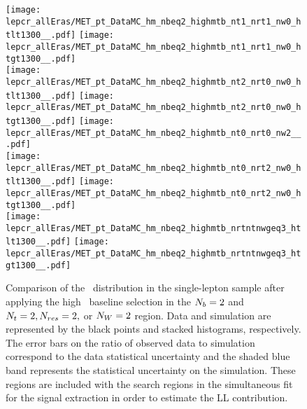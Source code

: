 \begin{figure}[!h]
	\begin{center}
  \texttt{[image: lepcr\_allEras/MET\_pt\_DataMC\_hm\_nbeq2\_highmtb\_nt1\_nrt1\_nw0\_htlt1300\_\_.pdf]}
  \texttt{[image: lepcr\_allEras/MET\_pt\_DataMC\_hm\_nbeq2\_highmtb\_nt1\_nrt1\_nw0\_htgt1300\_\_.pdf]} \\
  \texttt{[image: lepcr\_allEras/MET\_pt\_DataMC\_hm\_nbeq2\_highmtb\_nt2\_nrt0\_nw0\_htlt1300\_\_.pdf]}
  \texttt{[image: lepcr\_allEras/MET\_pt\_DataMC\_hm\_nbeq2\_highmtb\_nt2\_nrt0\_nw0\_htgt1300\_\_.pdf]} 
  \texttt{[image: lepcr\_allEras/MET\_pt\_DataMC\_hm\_nbeq2\_highmtb\_nt0\_nrt0\_nw2\_\_.pdf]} \\
  \texttt{[image: lepcr\_allEras/MET\_pt\_DataMC\_hm\_nbeq2\_highmtb\_nt0\_nrt2\_nw0\_htlt1300\_\_.pdf]}  
  \texttt{[image: lepcr\_allEras/MET\_pt\_DataMC\_hm\_nbeq2\_highmtb\_nt0\_nrt2\_nw0\_htgt1300\_\_.pdf]} \\
  \texttt{[image: lepcr\_allEras/MET\_pt\_DataMC\_hm\_nbeq2\_highmtb\_nrtntnwgeq3\_htlt1300\_\_.pdf]} 
  \texttt{[image: lepcr\_allEras/MET\_pt\_DataMC\_hm\_nbeq2\_highmtb\_nrtntnwgeq3\_htgt1300\_\_.pdf]} \\
	\end{center}
	\caption[Lost Lepton HM Control Region $\nb=2$ with 2 heavy objects]{Comparison of the \met~distribution in the single-lepton sample after applying the high \dm~baseline selection in the $\nb=2$ and $N_{t}=2, N_{res}=2,$ or $N_{W}=2$ region. Data and simulation are represented by the black points and stacked histograms, respectively. The error bars on the ratio of observed data to simulation correspond to the data statistical uncertainty and the shaded blue band represents the statistical uncertainty on the simulation. These regions are included with the search regions in the simultaneous fit for the signal extraction in order to estimate the LL contribution.
	 }
	\label{fig:llb-1lcr-datavsmc-hm-nb2-2}
\end{figure}

